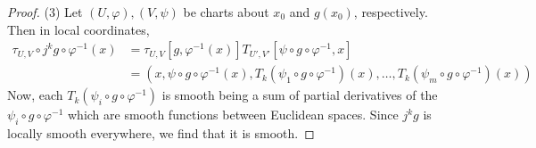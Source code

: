 \documentclass[reqno]{amsart}
\theoremstyle{definition}
\theoremstyle{remark}
\begin{document}
\begin{proof}
    (3) Let $\left( U, \varphi  \right) ,
    \left( V, \psi  \right) $ be charts about
    $x_0$ and $g(x_0)$, respectively. 
    Then
    in local coordinates,
    \begin{align*}
    \tau_{U,V} \circ j^{k}g \circ \varphi^{-1}(x)
    &= \tau_{U,V} \left[ g, \varphi^{-1}(x) \right] 
    T_{U',V'} \left[ \psi \circ g \circ \varphi^{-1}, x \right] \\
    &=
    \left( x, \psi \circ g \circ \varphi^{-1}(x),
    T_k\left( \psi_1 \circ g \circ \varphi^{-1} \right) (x),
\ldots, T_k \left( \psi_m \circ g \circ \varphi^{-1} \right) (x)
\right)
    \end{align*}
    Now, each
    $T_k \left( \psi_i \circ g \circ \varphi^{-1} \right) $ 
    is smooth being a sum of partial derivatives of the
    $\psi_i \circ g \circ \varphi^{-1}$ 
    which are smooth functions between Euclidean spaces.
    Since $j^{k}g$ is locally smooth everywhere, we find
    that it is smooth.
\end{proof}
\end{document}
